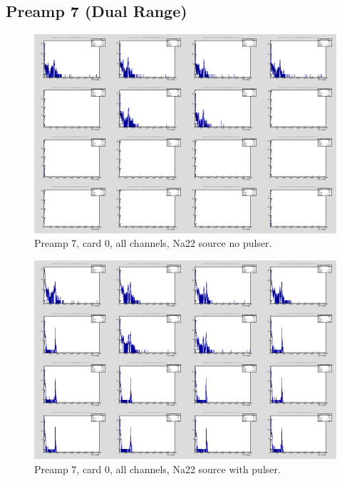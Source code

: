 \documentclass{report}
\begin{document}
\subsection{Preamp 7 (Dual Range)}
\begin{figure}[!htb]
  \includegraphics[width=\linewidth]{dr_latest_test/preamp7_lim_energy_card0_all_no_pulser.png}
  \caption{Preamp 7, card 0, all channels, Na22 source  no pulser.}
\end{figure}
\begin{figure}[!htb]
  \includegraphics[width=\linewidth]{dr_latest_test/preamp7_lim_energy_card0_pulser.png}
  \caption{Preamp 7, card 0, all channels, Na22 source with pulser.}
\end{figure}
\end{document}
